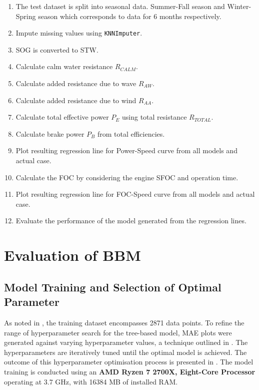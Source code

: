 \begin{enumerate}
    \setlength\itemsep{0em}
    \item The test dataset is split into seasonal data. Summer-Fall season and Winter-Spring season which corresponds to data for 6 months respectively.
    \item Impute missing values using {\tt KNNImputer}.
    \item SOG is converted to STW.
    \item Calculate calm water resistance $R_{CALM}$.
    \item Calculate added resistance due to wave $R_{AW}$.
    \item Calculate added resistance due to wind $R_{AA}$.
    \item Calculate total effective power $P_E$ using total resistance $R_{TOTAL}$.
    \item Calculate brake power $P_B$ from total efficiencies.
    \item Plot resulting regression line for Power-Speed curve from all models and actual case. 
    \item Calculate the FOC by considering the engine SFOC and operation time.
    \item Plot resulting regression line for FOC-Speed curve from all models and actual case.
    \item Evaluate the performance of the model generated from the regression lines.
\end{enumerate}

\section{Evaluation of BBM}\label{sec:BBM_tree_evaluate}

\subsection{Model Training and Selection of Optimal Parameter}\label{sec:hpo_select_train}

As noted in , the training dataset encompasses 2871 data points. To refine the range of hyperparameter search for the tree-based model, MAE plots were generated against varying hyperparameter values, a technique outlined in . The hyperparameters are iteratively tuned until the optimal model is achieved. The outcome of this hyperparameter optimisation process is presented in . The model training is conducted using an \textbf{AMD Ryzen 7 2700X, Eight-Core Processor} operating at 3.7 GHz, with 16384 MB of installed RAM.\\

